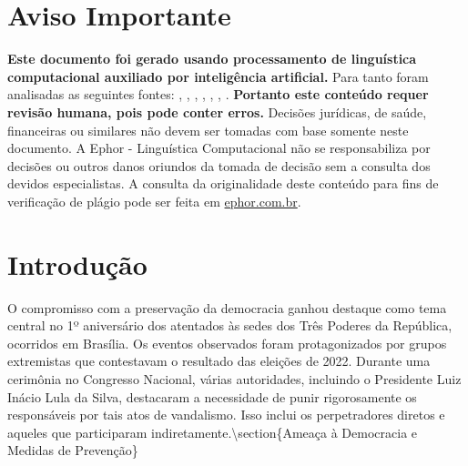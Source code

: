 \documentclass[
   article,       
   12pt,          
   oneside,       
   a4paper,       
   english,       
   brazil,        
   sumario=tradicional
   ]{abntex2}
\begin{document}
\frenchspacing 
\maketitle

\textual
\section{Aviso Importante}
\textbf{Este documento foi gerado usando processamento de linguística computacional auxiliado por inteligência artificial.} Para tanto foram analisadas as seguintes fontes:  \cite{8_de_janeiro_38_confessaram_crimes_e_fecharam}, \cite{8_de_Janeiro_Agentes_do_caos_seguem_ativos_e_}, \cite{8_de_janeiro_de_2023_o_dia_que_a_democracia_f}, \cite{Lula_diz_que_nao_havera_perdao_para_os_culpad}, \cite{Quaest_89_reprovam_atos_golpistas_de_8_de_jan}, \cite{Roberto_Amaral_8_de_janeiro_adeus_as_ilusoesg}, \cite{Visao_do_Correio_Democracia_fortalecidaqpkgpw}.
\textbf{Portanto este conteúdo requer revisão humana, pois pode conter erros.} Decisões jurídicas, de saúde, financeiras ou similares não devem ser tomadas com base somente neste documento. A Ephor - Linguística Computacional não se responsabiliza por decisões ou outros danos oriundos da tomada de decisão sem a consulta dos devidos especialistas.
A consulta da originalidade deste conteúdo para fins de verificação de plágio pode ser feita em \href{http://www.ephor.com.br}{ephor.com.br}.
\section{Introdução}
O compromisso com a preservação da democracia ganhou destaque como tema central no 1º aniversário dos atentados às sedes dos Três Poderes da República, ocorridos em Brasília. Os eventos observados foram protagonizados por grupos extremistas que contestavam o resultado das eleições de 2022. Durante uma cerimônia no Congresso Nacional, várias autoridades, incluindo o Presidente Luiz Inácio Lula da Silva, destacaram a necessidade de punir rigorosamente os responsáveis por tais atos de vandalismo. Isso inclui os perpetradores diretos e aqueles que participaram indiretamente.\textbackslash{}section\{Ameaça à Democracia e Medidas de Prevenção\}
\end{document}
